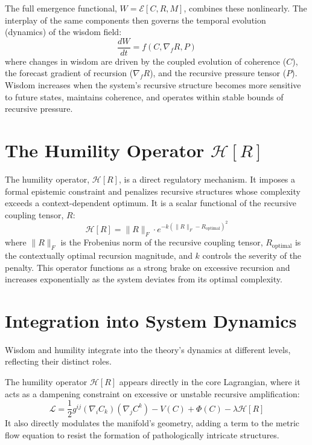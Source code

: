 The full emergence functional, \(W = \mathcal{E}[C, R, M]\), combines these nonlinearly. The interplay of the same components then governs the temporal evolution (dynamics) of the wisdom field:
\begin{equation}
\frac{dW}{dt} = f(C, \nabla_f R, P)
\end{equation}
where changes in wisdom are driven by the coupled evolution of coherence (\(C\)), the forecast gradient of recursion (\(\nabla_f R\)), and the recursive pressure tensor (\(P\)). Wisdom increases when the system's recursive structure becomes more sensitive to future states, maintains coherence, and operates within stable bounds of recursive pressure.

\section{The Humility Operator \(\mathcal{H}[R]\)}

The humility operator, \(\mathcal{H}[R]\), is a direct regulatory mechanism. It imposes a formal epistemic constraint and penalizes recursive structures whose complexity exceeds a context-dependent optimum. It is a scalar functional of the recursive coupling tensor, \(R\):
\begin{equation}
\mathcal{H}[R] = \|R\|_F \cdot e^{-k(\|R\|_F - R_{\text{optimal}})^2}
\end{equation}
where \(\|R\|_F\) is the Frobenius norm of the recursive coupling tensor, \(R_{\text{optimal}}\) is the contextually optimal recursion magnitude, and \(k\) controls the severity of the penalty. This operator functions as a strong brake on excessive recursion and increases exponentially as the system deviates from its optimal complexity.

\section{Integration into System Dynamics}

Wisdom and humility integrate into the theory's dynamics at different levels, reflecting their distinct roles.

The humility operator \(\mathcal{H}[R]\) appears directly in the core Lagrangian, where it acts as a dampening constraint on excessive or unstable recursive amplification:
\begin{equation}
\mathcal{L} = \frac{1}{2} g^{ij} (\nabla_i C_k)(\nabla_j C^k) - V(C) + \Phi(C) - \lambda \mathcal{H}[R]
\end{equation}
It also directly modulates the manifold's geometry, adding a term to the metric flow equation to resist the formation of pathologically intricate structures.

